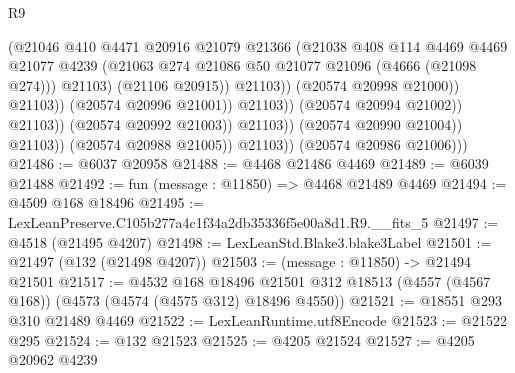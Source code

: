 \begin{lexlean}{R9}
\begin{coremodule}
                                                (@21046
                                                  @410
                                                  @4471
                                                  @20916
                                                  @21079
                                                  @21366
                                                  (@21038
                                                    @408
                                                    @114
                                                    @4469
                                                    @4469
                                                    @21077
                                                    @4239
                                                    (@21063
                                                      @274
                                                      @21086
                                                      @50
                                                      @21077
                                                      @21096
                                                      (@4666 (@21098 @274)))
                                                    @21103)
                                                  (@21106 @20915))
                                                @21103))
                                            (@20574 @20998 @21000))
                                          @21103))
                                      (@20574 @20996 @21001))
                                    @21103))
                                (@20574 @20994 @21002))
                              @21103))
                          (@20574 @20992 @21003))
                        @21103))
                    (@20574 @20990 @21004))
                  @21103))
              (@20574 @20988 @21005))
            @21103))
        (@20574 @20986 @21006)))
@21486 := @6037 @20958
@21488 := @4468 @21486 @4469
@21489 := @6039 @21488
@21492 := fun (message : @11850) => @4468 @21489 @4469
@21494 := @4509 @168 @18496
@21495 := LexLeanPreserve.C105b277a4c1f34a2db35336f5e00a8d1.R9.__fits_5
@21497 := @4518 (@21495 @4207)
@21498 := LexLeanStd.Blake3.blake3Label
@21501 := @21497 (@132 (@21498 @4207))
@21503 := (message : @11850) -> @21494 @21501
@21517 := @4532
    @168
    @18496
    @21501
    @312
    @18513
    (@4557 (@4567 @168))
    (@4573 (@4574 (@4575 @312) @18496 @4550))
@21521 := @18551 @293 @310 @21489 @4469
@21522 := LexLeanRuntime.utf8Encode
@21523 := @21522 @295
@21524 := @132 @21523
@21525 := @4205 @21524
@21527 := @4205 @20962 @4239

\end{coremodule}
\end{lexlean}
